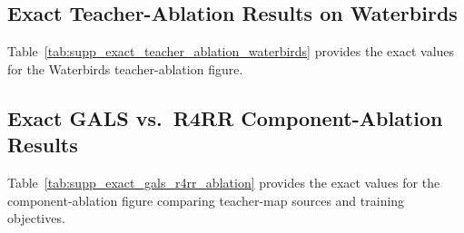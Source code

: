 \documentclass[10pt,twocolumn,letterpaper]{article}
\begin{document}
\subsection{Exact Teacher-Ablation Results on Waterbirds}
\label{appendix:exact_teacher_ablation_waterbirds}

Table~\ref{tab:supp_exact_teacher_ablation_waterbirds} provides the exact values for the Waterbirds teacher-ablation figure.

\begin{table}[h]
\centering
\caption{\textbf{Exact Waterbirds teacher-ablation results.} OCLIP denotes OpenCLIP. Higher is better.}
\label{tab:supp_exact_teacher_ablation_waterbirds}
\small
\setlength{\tabcolsep}{5pt}
\renewcommand{\arraystretch}{1.12}
\end{table}


\subsection{Exact GALS vs.\ R4RR Component-Ablation Results}
\label{appendix:exact_gals_r4rr_ablation}

Table~\ref{tab:supp_exact_gals_r4rr_ablation} provides the exact values for the component-ablation figure comparing teacher-map sources and training objectives.
\end{document}
